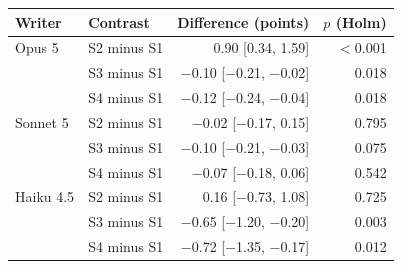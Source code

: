 \begin{tabular}{llrr}
\toprule
Writer & Contrast & Difference (points) & $p$ (Holm) \\
\midrule
Opus 5 & S2 minus S1 & 0.90 [0.34, 1.59] & $<$0.001 \\
 & S3 minus S1 & $-$0.10 [$-$0.21, $-$0.02] & 0.018 \\
 & S4 minus S1 & $-$0.12 [$-$0.24, $-$0.04] & 0.018 \\
\midrule
Sonnet 5 & S2 minus S1 & $-$0.02 [$-$0.17, 0.15] & 0.795 \\
 & S3 minus S1 & $-$0.10 [$-$0.21, $-$0.03] & 0.075 \\
 & S4 minus S1 & $-$0.07 [$-$0.18, 0.06] & 0.542 \\
\midrule
Haiku 4.5 & S2 minus S1 & 0.16 [$-$0.73, 1.08] & 0.725 \\
 & S3 minus S1 & $-$0.65 [$-$1.20, $-$0.20] & 0.003 \\
 & S4 minus S1 & $-$0.72 [$-$1.35, $-$0.17] & 0.012 \\
\bottomrule
\end{tabular}
